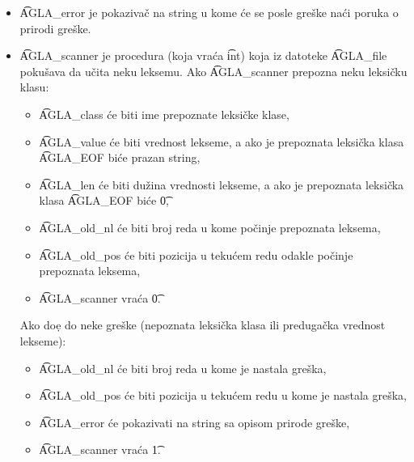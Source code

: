 \begin{itemize}
{          u\v citavati lekseme.
        }
        \item
        {
          \t{AGLA\_error} je pokaziva\v c na string u kome \'ce se posle
          gre\v ske na\'ci poruka o prirodi gre\v ske.
        }
        \item
        {
          \t{AGLA\_scanner} je procedura (koja vra\'ca \t{int}) koja iz
          datoteke \t{AGLA\_file} poku\v sava da u\v cita neku leksemu.
          Ako \t{AGLA\_scanner} prepozna neku leksi\v cku klasu:
          \begin{itemize}
            \item
            {
              \t{AGLA\_class} \'ce biti ime prepoznate leksi\v cke klase,
            }
            \item
            {
              \t{AGLA\_value} \'ce biti vrednost lekseme, a ako je
              prepoznata leksi\v cka klasa \t{AGLA\_EOF} bi\'ce prazan
              string,
            }
            \item
            {
              \t{AGLA\_len} \'ce biti du\v zina vrednosti lekseme, a ako
              je prepoznata leksi\-\v cka klasa \t{AGLA\_EOF} bi\'ce \t{0},
            }
            \item
            {
              \t{AGLA\_old\_nl} \'ce biti broj reda u kome po\v cinje
              prepoznata leksema,
            }
            \item
            {
              \t{AGLA\_old\_pos} \'ce biti pozicija u teku\'cem redu odakle
              po\v cinje prepo\-znata leksema,
            }
            \item
            {
              \t{AGLA\_scanner} vra\'ca \t{0}.
            }
          \end{itemize}
          Ako do\d e do neke gre\v ske (nepoznata leksi\v cka klasa ili
          preduga\v cka vrednost lekseme):
          \begin{itemize}
            \item
            {
              \t{AGLA\_old\_nl} \'ce biti broj reda u kome je nastala
              gre\v ska,
            }
            \item
            {
              \t{AGLA\_old\_pos} \'ce biti pozicija u teku\'cem redu u kome
              je nastala gre\v ska,
            }
            \item
            {
              \t{AGLA\_error} \'ce pokazivati na string sa opisom prirode
              gre\v ske,
            }
            \item
            {
              \t{AGLA\_scanner} vra\'ca \t{1}.
            }
          \end{itemize}
        }
      \end{itemize}

